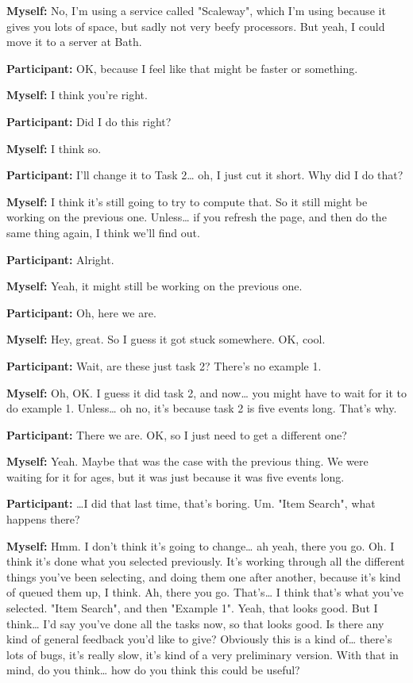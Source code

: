 \documentclass[11pt]{report}
\begin{document}
\begin{linenumbers}
\textbf{Myself:} No, I'm using a service called "Scaleway", which I'm using because it gives you lots of space, but sadly not very beefy processors. But yeah, I could move it to a server at Bath.

\textbf{Participant:} OK, because I feel like that might be faster or something.

\textbf{Myself:} I think you're right.

\textbf{Participant:} Did I do this right?

\textbf{Myself:} I think so.

\textbf{Participant:} I'll change it to Task 2\ldots{} oh, I just cut it short. Why did I do that?

\textbf{Myself:} I think it's still going to try to compute that. So it still might be working on the previous one. Unless\ldots{} if you refresh the page, and then do the same thing again, I think we'll find out.

\textbf{Participant:} Alright.

\textbf{Myself:} Yeah, it might still be working on the previous one.

\textbf{Participant:} Oh, here we are.

\textbf{Myself:} Hey, great. So I guess it got stuck somewhere. OK, cool.

\textbf{Participant:} Wait, are these just task 2? There's no example 1.

\textbf{Myself:} Oh, OK. I guess it did task 2, and now\ldots{} you might have to wait for it to do example 1. Unless\ldots{} oh no, it's because task 2 is five events long. That's why.

\textbf{Participant:} There we are. OK, so I just need to get a different one?

\textbf{Myself:} Yeah. Maybe that was the case with the previous thing. We were waiting for it for ages, but it was just because it was five events long.

\textbf{Participant:} \ldots{}I did that last time, that's boring. Um. "Item Search", what happens there?

\textbf{Myself:} Hmm. I don't think it's going to change\ldots{} ah yeah, there you go. Oh. I think it's done what you selected previously. It's working through all the different things you've been selecting, and doing them one after another, because it's kind of queued them up, I think. Ah, there you go. That's\ldots{} I think that's what you've selected. "Item Search", and then "Example 1". Yeah, that looks good. But I think\ldots{} I'd say you've done all the tasks now, so that looks good. Is there any kind of general feedback you'd like to give? Obviously this is a kind of\ldots{} there's lots of bugs, it's really slow, it's kind of a very preliminary version. With that in mind, do you think\ldots{} how do you think this could be useful?


\end{linenumbers}
\end{document}
